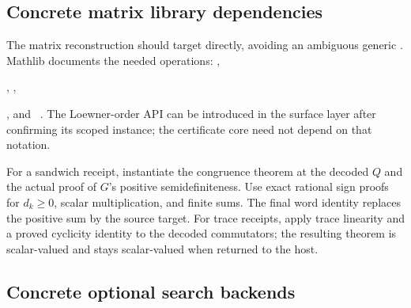 \subsection{Concrete matrix library dependencies}

The matrix reconstruction should target  directly,
avoiding an ambiguous generic . Mathlib documents the needed
operations: ,\par
{}, ,\par
{}, and
~\cite{matrix-posdef}.
The Loewner-order API can be introduced in the surface layer after confirming
its scoped instance; the certificate core need not depend on that notation.

For a sandwich receipt, instantiate the congruence theorem at the decoded $Q$
and the actual proof of $G$'s positive semidefiniteness. Use exact rational sign
proofs for $d_k\ge0$, scalar multiplication, and finite sums. The final word
identity replaces the positive sum by the source target. For trace receipts,
apply trace linearity and a proved cyclicity identity to the decoded
commutators; the resulting theorem is scalar-valued and stays scalar-valued
when returned to the host.

\subsection{Concrete optional search backends}

